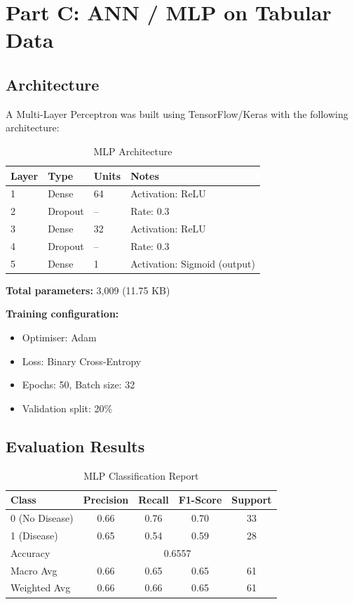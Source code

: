 \documentclass[12pt,a4paper]{article}
\begin{document}
\section{Part C: ANN / MLP on Tabular Data}

\subsection{Architecture}

A Multi-Layer Perceptron was built using TensorFlow/Keras with the following architecture:

\begin{table}[H]
\centering
\caption{MLP Architecture}
\begin{tabular}{llll}
\toprule
\textbf{Layer} & \textbf{Type} & \textbf{Units} & \textbf{Notes} \\
\midrule
1 & Dense   & 64  & Activation: ReLU \\
2 & Dropout & --  & Rate: 0.3 \\
3 & Dense   & 32  & Activation: ReLU \\
4 & Dropout & --  & Rate: 0.3 \\
5 & Dense   & 1   & Activation: Sigmoid (output) \\
\bottomrule
\end{tabular}
\end{table}

\textbf{Total parameters:} 3,009 (11.75 KB)

\textbf{Training configuration:}
\begin{itemize}
    \item Optimiser: Adam
    \item Loss: Binary Cross-Entropy
    \item Epochs: 50, Batch size: 32
    \item Validation split: 20\%
\end{itemize}

\subsection{Evaluation Results}

\begin{table}[H]
\centering
\caption{MLP Classification Report}
\begin{tabular}{lcccc}
\toprule
\textbf{Class} & \textbf{Precision} & \textbf{Recall} & \textbf{F1-Score} & \textbf{Support} \\
\midrule
0 (No Disease) & 0.66 & 0.76 & 0.70 & 33 \\
1 (Disease)    & 0.65 & 0.54 & 0.59 & 28 \\
\midrule
Accuracy       & \multicolumn{4}{c}{0.6557} \\
Macro Avg      & 0.66 & 0.65 & 0.65 & 61 \\
Weighted Avg   & 0.66 & 0.66 & 0.65 & 61 \\
\bottomrule
\end{tabular}
\end{table}
\end{document}

